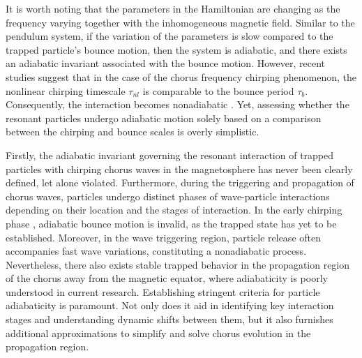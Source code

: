 It is worth noting that the parameters in the Hamiltonian are changing as the frequency varying together with the inhomogeneous magnetic field.
Similar to the pendulum system, if the variation of the parameters is slow compared to the trapped particle's bounce motion, then the system is adiabatic, and there exists an adiabatic invariant associated with the bounce motion.
However, recent studies suggest that in the case of the chorus frequency chirping phenomenon, the nonlinear chirping timescale $\tau_{nl}$ is comparable to the bounce period $\tau_{b}$. 
Consequently, the interaction becomes nonadiabatic \cite{tao2017a,tao2017b}.
Yet, assessing whether the resonant particles undergo adiabatic motion solely based on a comparison between the chirping and bounce scales is overly simplistic.


Firstly, the adiabatic invariant governing the resonant interaction of trapped particles with chirping chorus waves in the magnetosphere has never been clearly defined, let alone violated.
Furthermore, during the triggering and propagation of chorus waves, particles undergo distinct phases of wave-particle interactions depending on their location and the stages of interaction.
In the early chirping phase \cite{bierwage2021}, adiabatic bounce motion is invalid, as the trapped state has yet to be established.
Moreover, in the wave triggering region, particle release \cite{tao_trap-release-amplify_2021} often accompanies fast wave variations, constituting a nonadiabatic process.
Nevertheless, there also exists stable trapped behavior \cite{zheng2024} in the propagation region of the chorus away from the magnetic equator, where adiabaticity is poorly understood in current research. 
Establishing stringent criteria for particle adiabaticity is paramount.
Not only does it aid in identifying key interaction stages and understanding dynamic shifts between them, but it also furnishes additional approximations to simplify and solve chorus evolution in the propagation region.

